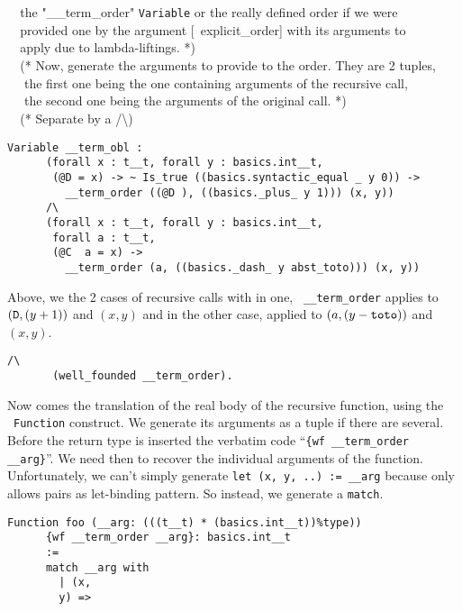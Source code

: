 \verb+  +the "\_\_term\_order" {\tt Variable} or the really defined order if we were \\
\verb+  +provided one by the argument [~explicit\_order] with its arguments to \\
\verb+  +apply due to lambda-liftings. *) \\
\verb+  +(* Now, generate the arguments to provide to the order. They are 2 tuples, \\
\verb+  + the first one being the one containing arguments of the recursive call, \\
\verb+  + the second one being the arguments of the original call. *) \\
\verb+  +(* Separate by a /\textbackslash *)

{\footnotesize
\begin{lstlisting}[language=MyCoq]
    Variable __term_obl :
      (forall x : t__t, forall y : basics.int__t,
       (@D = x) -> ~ Is_true ((basics.syntactic_equal _ y 0)) ->
         __term_order ((@D ), ((basics._plus_ y 1))) (x, y))
      /\
      (forall x : t__t, forall y : basics.int__t,
       forall a : t__t,
       (@C  a = x) ->
         __term_order (a, ((basics._dash_ y abst_toto))) (x, y))
\end{lstlisting}
}

Above, we the 2 cases of recursive calls with in one, {\tt
  \_\_term\_order} applies to $({\tt D}, (y+1))$ and $(x, y)$ and in
the other case, applied to $(a, (y - {\tt toto}))$ and $(x, y)$.

{\footnotesize
\begin{lstlisting}[language=MyCoq]
      /\
       (well_founded __term_order).
\end{lstlisting}
}

Now comes the translation of the real body of the recursive function,
using the \coq\ {\tt Function} construct. We generate its arguments as
a tuple if there are several. Before the return type is inserted the
verbatim code ``{\tt \{wf \_\_term\_order \_\_arg\}}''. We need then
to recover the individual arguments of the function. Unfortunately, we
can't simply generate {\tt let (x, y, ..) := \_\_arg} because \coq
only allows pairs as let-binding pattern. So instead,  we generate a
{\tt match}.

{\footnotesize
\begin{lstlisting}[language=MyCoq]
    Function foo (__arg: (((t__t) * (basics.int__t))%type))
      {wf __term_order __arg}: basics.int__t
      :=
      match __arg with
        | (x,
        y) =>
\end{lstlisting}
}


